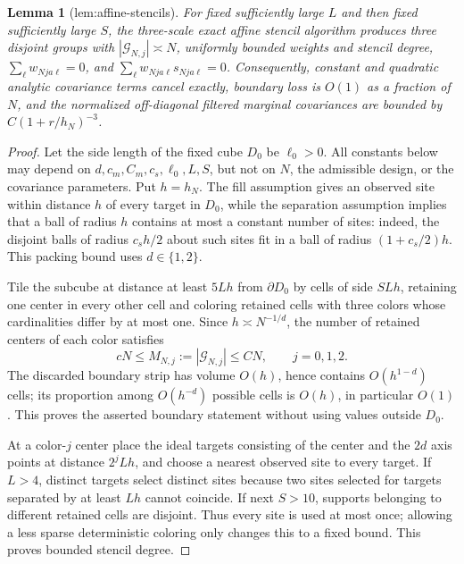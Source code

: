 \documentclass{article}
\newtheorem{lemma}{Lemma}
\begin{document}
\begin{lemma}[lem:affine-stencils]\label{lem:affine-stencils}
For fixed sufficiently large \(L\) and then fixed sufficiently large \(S\), the three-scale exact affine stencil algorithm produces three disjoint groups with \(|\mathcal G_{N,j}|\asymp N\), uniformly bounded weights and stencil degree, \(\sum_{\ell}w_{Nja\ell}=0\), and \(\sum_{\ell}w_{Nja\ell}s_{Nja\ell}=0\). Consequently, constant and quadratic analytic covariance terms cancel exactly, boundary loss is \(O(1)\) as a fraction of \(N\), and the normalized off-diagonal filtered marginal covariances are bounded by \(C(1+r/h_N)^{-3}\).
\end{lemma}
\begin{proof}
Let the side length of the fixed cube \(D_0\) be \(\ell_0>0\).  All constants below may depend on \(d,c_m,C_m,c_s,\ell_0,L,S\), but not on \(N\), the admissible design, or the covariance parameters.  Put \(h=h_N\).  The fill assumption gives an observed site within distance \(h\) of every target in \(D_0\), while the separation assumption implies that a ball of radius \(h\) contains at most a constant number of sites: indeed, the disjoint balls of radius \(c_sh/2\) about such sites fit in a ball of radius \((1+c_s/2)h\).  This packing bound uses \(d\in\{1,2\}\).

Tile the subcube at distance at least \(5Lh\) from \(\partial D_0\) by cells of side \(SLh\), retaining one center in every other cell and coloring retained cells with three colors whose cardinalities differ by at most one.  Since \(h\asymp N^{-1/d}\), the number of retained centers of each color satisfies
\[
 cN\le M_{N,j}:=|\mathcal G_{N,j}|\le CN,
 \qquad j=0,1,2.
\]
The discarded boundary strip has volume \(O(h)\), hence contains \(O(h^{1-d})\) cells; its proportion among \(O(h^{-d})\) possible cells is \(O(h)\), in particular \(O(1)\).  This proves the asserted boundary statement without using values outside \(D_0\).

At a color-\(j\) center place the ideal targets consisting of the center and the \(2d\) axis points at distance \(2^jLh\), and choose a nearest observed site to every target.  If \(L>4\), distinct targets select distinct sites because two sites selected for targets separated by at least \(Lh\) cannot coincide.  If next \(S>10\), supports belonging to different retained cells are disjoint.  Thus every site is used at most once; allowing a less sparse deterministic coloring only changes this to a fixed bound.  This proves bounded stencil degree.


\end{proof}
\end{document}
